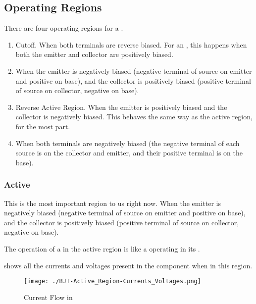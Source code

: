 \subsection{Operating Regions}\label{subsec:Operating_Regions}
There are four operating regions for a .
\begin{enumerate}[noitemsep]
\item Cutoff.
  When both terminals are reverse biased.
  For an \NPNTransistor{}, this happens when both the emitter and collector are positively biased.
\item {}
  When the emitter is negatively biased (negative terminal of source on emitter and positive on base), and the collector is positively biased (positive terminal of source on collector, negative on base).
\item Reverse Active Region.
  When the emitter is positively biased and the collector is negatively biased.
  This behaves the same way as the active region, for the most part.
\item {}
  When both terminals are negatively biased (the negative terminal of each source is on the collector and emitter, and their positive terminal is on the base).
\end{enumerate}

\subsubsection{Active}\label{subsubsec:BJT_Active_Region}
This is the most important region to us right now.
When the emitter is negatively biased (negative terminal of source on emitter and positive on base), and the collector is positively biased (positive terminal of source on collector, negative on base).

\begin{remark*}
  The operation of a  in the active region is like a  operating in its .
\end{remark*}

 shows all the currents and voltages present in the component when in this region.

\begin{figure}[h!tbp]
  \centering
  \texttt{[image: ./BJT-Active\_Region-Currents\_Voltages.png]}
  \caption{ Current Flow in  \parencite[p.~308]{sedraTextbook7}}
  \label{fig:BJT-Active_Region}
\end{figure}


